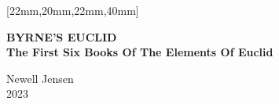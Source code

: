 \documentclass[
    12pt,
    coverheight=9.236in, %
    coverwidth=6.197in, %
    spinewidth=0.959in, %
    bleedwidth=0.125in,
    foldingmargin,
    ]{bookcover}
\begin{document}
\thispagestyle{empty}
\begin{bookcover}
    \thispagestyle{empty}





    [22mm,20mm,22mm,40mm]{
        \centering
        {\Huge\bfseries BYRNE'S EUCLID}\\
        \vspace{4ex}
        {\Large\bfseries The First Six Books Of The Elements Of Euclid}\\

        \vfill

        

        \vfill

        \LARGE{Newell Jensen}\\
        \LARGE{2023}
    }


\end{bookcover}
\end{document}
